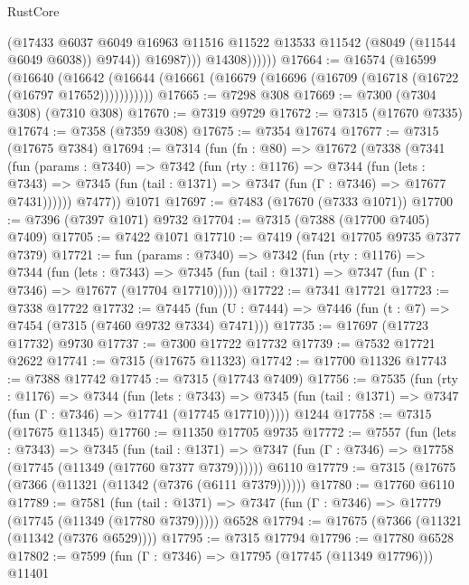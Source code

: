\begin{lexlean}{RustCore}
\begin{coremodule}
                        (@17433
                          @6037
                          @6049
                          @16963
                          @11516
                          @11522
                          @13533
                          @11542
                          (@8049 (@11544 @6049 @6038))
                          @9744))
                      @16987)))
                @14308))))))
@17664 := @16574
    (@16599
      (@16640
        (@16642 (@16644 (@16661 (@16679 (@16696 (@16709 (@16718 (@16722 (@16797 @17652)))))))))))
@17665 := @7298 @308
@17669 := @7300 (@7304 @308) (@7310 @308)
@17670 := @7319 @9729
@17672 := @7315 (@17670 @7335)
@17674 := @7358 (@7359 @308)
@17675 := @7354 @17674
@17677 := @7315 (@17675 @7384)
@17694 := @7314
    (fun (fn : @80) =>
    @17672
      (@7338
        (@7341
          (fun (params : @7340) =>
          @7342
            (fun (rty : @1176) =>
            @7344
              (fun (lets : @7343) =>
              @7345 (fun (tail : @1371) => @7347 (fun (Γ : @7346) => @17677 @7431))))))
        @7477))
    @1071
@17697 := @7483 (@17670 (@7333 @1071))
@17700 := @7396 (@7397 @1071) @9732
@17704 := @7315 (@7388 (@17700 @7405) @7409)
@17705 := @7422 @1071
@17710 := @7419 (@7421 @17705 @9735 @7377 @7379)
@17721 := fun (params : @7340) =>
  @7342
    (fun (rty : @1176) =>
    @7344
      (fun (lets : @7343) =>
      @7345 (fun (tail : @1371) => @7347 (fun (Γ : @7346) => @17677 (@17704 @17710)))))
@17722 := @7341 @17721
@17723 := @7338 @17722
@17732 := @7445 (fun (U : @7444) => @7446 (fun (t : @7) => @7454 (@7315 (@7460 @9732 @7334) @7471)))
@17735 := @17697 (@17723 @17732) @9730
@17737 := @7300 @17722 @17732
@17739 := @7532 @17721 @2622
@17741 := @7315 (@17675 @11323)
@17742 := @17700 @11326
@17743 := @7388 @17742
@17745 := @7315 (@17743 @7409)
@17756 := @7535
    (fun (rty : @1176) =>
    @7344
      (fun (lets : @7343) =>
      @7345 (fun (tail : @1371) => @7347 (fun (Γ : @7346) => @17741 (@17745 @17710)))))
    @1244
@17758 := @7315 (@17675 @11345)
@17760 := @11350 @17705 @9735
@17772 := @7557
    (fun (lets : @7343) =>
    @7345
      (fun (tail : @1371) =>
      @7347 (fun (Γ : @7346) => @17758 (@17745 (@11349 (@17760 @7377 @7379))))))
    @6110
@17779 := @7315 (@17675 (@7366 (@11321 (@11342 (@7376 (@6111 @7379))))))
@17780 := @17760 @6110
@17789 := @7581
    (fun (tail : @1371) => @7347 (fun (Γ : @7346) => @17779 (@17745 (@11349 (@17780 @7379)))))
    @6528
@17794 := @17675 (@7366 (@11321 (@11342 (@7376 @6529))))
@17795 := @7315 @17794
@17796 := @17780 @6528
@17802 := @7599 (fun (Γ : @7346) => @17795 (@17745 (@11349 @17796))) @11401

\end{coremodule}
\end{lexlean}
